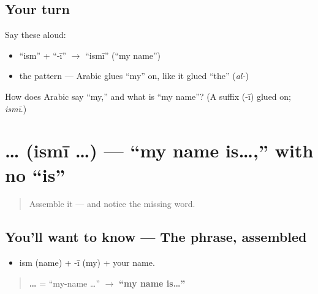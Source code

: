 \subsection*{Your turn}
Say these aloud:

\begin{itemize}
\raggedright
  \item \textquotedblleft{}ism\textquotedblright{} + \textquotedblleft{}-ī\textquotedblright{} $\to$ \textquotedblleft{}ismī\textquotedblright{} (\textquotedblleft{}my name\textquotedblright{})
  \item the pattern — Arabic glues \textquotedblleft{}my\textquotedblright{} on, like it glued \textquotedblleft{}the\textquotedblright{} (\emph{al-})
\end{itemize}

\begin{tcolorbox}[breakable,colback=teal!4,colframe=teal!35!black,title={Before you move on}]
How does Arabic say \textquotedblleft{}my,\textquotedblright{} and what is \textquotedblleft{}my name\textquotedblright{}? (A suffix \textbf{} (-ī) glued on; \emph{ismī}.)
\end{tcolorbox}
\section[\texorpdfstring{\ar{اسمي} … (ismī …)}{اسمي … (ismī …)}]{ … (ismī …) — \textquotedblleft{}my name is…,\textquotedblright{} with no \textquotedblleft{}is\textquotedblright{}}

\label{lesson:AR-C02-ismii}



\begin{quote}
Assemble it — and notice the missing word.
\end{quote}

\subsection*{You'll want to know — The phrase, assembled}
\begin{itemize}
\raggedright
  \item ism (name) + -ī (my) + your name.
\end{itemize}

\begin{quote}
\textbf{ …} = \textquotedblleft{}my-name …\textquotedblright{} $\to$ \textbf{\textquotedblleft{}my name is…\textquotedblright{}}
\end{quote}

